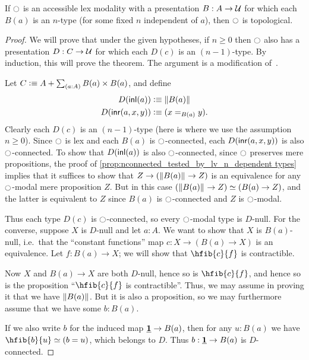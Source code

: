 \begin{thm}\label{thm:acc-ntypes-tpl}
  If ${\ocircle}$ is an accessible lex modality with a presentation $B:A\to\mathcal{U}$ for which each $B(a)$ is an $n$-type (for some fixed $n$ independent of $a$), then ${\ocircle}$ is topological.
\end{thm}
\begin{proof}
  We will prove that under the given hypotheses, if $n\ge 0$ then ${\ocircle}$ also has a presentation $D:C\to \mathcal{U}$ for which each $D(c)$ is an $(n-1)$-type.
  By induction, this will prove the theorem.
  The argument is a modification of~\cite[Lemma 7.5.11]{TheBook}.

  Let $C\defeq A + \sm{a:A} B(a)\times B(a)$, and define
  \begin{align*}
    D({\mathsf{inl}}(a)) &\vcentcolon\equiv \Vert B(a)\Vert_{}\\
    D({\mathsf{inr}}(a,x,y)) &\vcentcolon\equiv (x=_{B(a)} y).
  \end{align*}
  Clearly each $D(c)$ is an $(n-1)$-type (here is where we use the assumption $n\ge 0$).
  Since ${\ocircle}$ is lex and each $B(a)$ is ${\ocircle}$-connected, each $D({\mathsf{inr}}(a,x,y))$ is also ${\ocircle}$-connected.
  To show that $D({\mathsf{inl}}(a))$ is also ${\ocircle}$-connected, since ${\ocircle}$ preserves mere propositions, the proof of \cref{prop:nconnected_tested_by_lv_n_dependent types} implies that it suffices to show that $Z\to (\Vert B(a)\Vert_{} \to Z)$ is an equivalence for any ${\ocircle}$-modal mere proposition $Z$.
  But in this case $(\Vert B(a)\Vert_{} \to Z) \simeq (B(a) \to Z)$, and the latter is equivalent to $Z$ since $B(a)$ is ${\ocircle}$-connected and $Z$ is ${\ocircle}$-modal.

  Thus each type $D(c)$ is ${\ocircle}$-connected, so every ${\ocircle}$-modal type is $D$-null.
  For the converse, suppose $X$ is $D$-null and let $a:A$.
  We want to show that $X$ is $B(a)$-null, i.e.\ that the ``constant functions'' map $c : X\to (B(a) \to X)$ is an equivalence.
  Let $f:B(a) \to X$; we will show that $\hfib{c}{f}$ is contractible.

  Now $X$ and $B(a)\to X$ are both $D$-null, hence so is $\hfib{c}{f}$, and hence so is the proposition ``$\hfib{c}{f}$ is contractible''.
  Thus, we may assume in proving it that we have $\Vert B(a)\Vert_{}$.
  But it is also a proposition, so we may furthermore assume that we have some $b:B(a)$.

  If we also write $b$ for the induced map $\underline{\mathbf{1}} \to B(a)$, then for any $u:B(a)$ we have $\hfib{b}{u} \simeq (b=u)$, which belongs to $D$.
  Thus $b:\underline{\mathbf{1}}\to B(a)$ is $D$-connected.


\end{proof}
